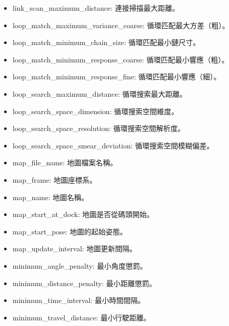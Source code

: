 \begin{itemize}
    \item link\_scan\_maximum\_distance: 連接掃描最大距離。

    \item loop\_match\_maximum\_variance\_coarse: 循環匹配最大方差（粗）。

    \item loop\_match\_minimum\_chain\_size: 循環匹配最小鏈尺寸。

    \item loop\_match\_minimum\_response\_coarse: 循環匹配最小響應（粗）。

    \item loop\_match\_minimum\_response\_fine: 循環匹配最小響應（細）。

    \item loop\_search\_maximum\_distance: 循環搜索最大距離。

    \item loop\_search\_space\_dimension: 循環搜索空間維度。

    \item loop\_search\_space\_resolution: 循環搜索空間解析度。

    \item loop\_search\_space\_smear\_deviation: 循環搜索空間模糊偏差。

    \item map\_file\_name: 地圖檔案名稱。

    \item map\_frame: 地圖座標系。

    \item map\_name: 地圖名稱。

    \item map\_start\_at\_dock: 地圖是否從碼頭開始。

    \item map\_start\_pose: 地圖的起始姿態。

    \item map\_update\_interval: 地圖更新間隔。

    \item minimum\_angle\_penalty: 最小角度懲罰。

    \item minimum\_distance\_penalty: 最小距離懲罰。

    \item minimum\_time\_interval: 最小時間間隔。

    \item minimum\_travel\_distance: 最小行駛距離。


\end{itemize}
